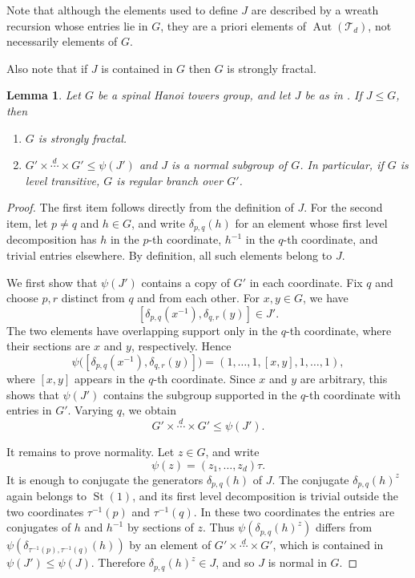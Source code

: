 \documentclass[11pt,leqno]{amsart}
\theoremstyle{plain}
\newtheorem{lemma}[lemma]{Lemma}
\newcommand\T{{\mathcal{T}}}
\DeclareMathOperator{\Aut}{Aut}
\DeclareMathOperator{\St}{St}
\numberwithin{equation}{section}
\begin{document}
Note that although the elements used to define $J$ are described by a wreath recursion whose entries lie in $G$, they are a priori elements of $\Aut(\T_d)$, not necessarily elements of $G$.

Also note that if $J$ is contained in $G$ then $G$ is strongly fractal.
\begin{lemma}\label{lemma:J-contains-derived-sections}
Let $G$ be a spinal Hanoi towers group, and let $J$ be as in
. If $J\leq G$, then
\begin{enumerate}
    \item $G$ is strongly fractal. 
    \item $G'\times \stackrel{d}{\cdots}\times G' \leq \psi(J')$ and $J$ is a normal subgroup of $G$. In particular, if $G$ is level transitive, $G$ is regular branch over $G'$.
\end{enumerate}
\end{lemma}

\begin{proof}
	The first item follows directly from the definition of $J$. For the second item, let
	$p\neq q$ and $h\in G$, and write $\delta_{p,q}(h)$ for an element whose first level
	decomposition has $h$ in the $p$-th coordinate, $h^{-1}$ in the $q$-th coordinate, and
	trivial entries elsewhere. By definition, all such elements belong to $J$.
	
	We first show that $\psi(J')$ contains a copy of $G'$ in each coordinate. Fix $q$ and
	choose $p,r$ distinct from $q$ and from each other. For $x,y\in G$, we have
	\[
	[\delta_{p,q}(x^{-1}),\delta_{q,r}(y)]\in J'.
	\]
	The two elements have overlapping support only in the $q$-th coordinate, where their
	sections are $x$ and $y$, respectively. Hence
	\[
	\psi\bigl([\delta_{p,q}(x^{-1}),\delta_{q,r}(y)]\bigr)
	=
	(1,\ldots,1,[x,y],1,\ldots,1),
	\]
	where $[x,y]$ appears in the $q$-th coordinate. Since $x$ and $y$ are arbitrary, this
	shows that $\psi(J')$ contains the subgroup supported in the $q$-th coordinate with
	entries in $G'$. Varying $q$, we obtain
	\[
	G'\times \stackrel{d}{\cdots}\times G'\leq \psi(J').
	\]
	
	It remains to prove normality. Let $z\in G$, and write
	\[
	\psi(z)=(z_1,\ldots,z_d)\tau.
	\]
	It is enough to conjugate the generators $\delta_{p,q}(h)$ of $J$. The conjugate
	$\delta_{p,q}(h)^z$ again belongs to $\St(1)$, and its first level decomposition is
	trivial outside the two coordinates $\tau^{-1}(p)$ and $\tau^{-1}(q)$. In these two
	coordinates the entries are conjugates of $h$ and $h^{-1}$ by sections of $z$. Thus
	$\psi(\delta_{p,q}(h)^z)$ differs from
	$\psi(\delta_{\tau^{-1}(p),\tau^{-1}(q)}(h))$ by an element of
	$G'\times \stackrel{d}{\cdots}\times G'$, which is contained in $\psi(J')\leq \psi(J)$.
	Therefore $\delta_{p,q}(h)^z\in J$, and so $J$ is normal in $G$.
\end{proof}
\end{document}
